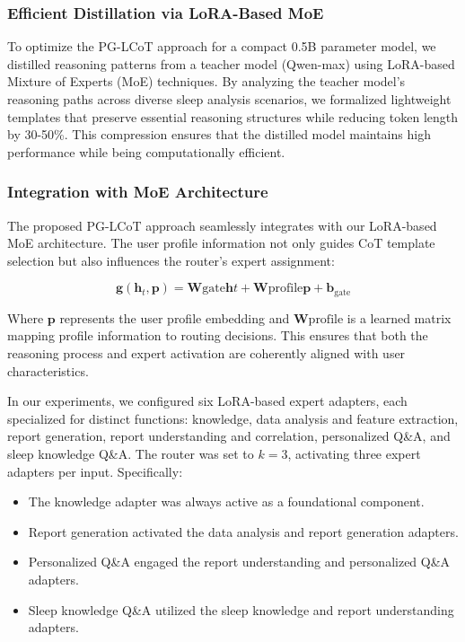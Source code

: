 \documentclass[preprint,12pt]{elsarticle}
\begin{document}
\subsubsection{Efficient Distillation via LoRA-Based MoE}

To optimize the PG-LCoT approach for a compact 0.5B parameter model, we distilled reasoning patterns from a teacher model (Qwen-max) using LoRA-based Mixture of Experts (MoE) techniques. By analyzing the teacher model's reasoning paths across diverse sleep analysis scenarios, we formalized lightweight templates that preserve essential reasoning structures while reducing token length by 30-50\%. This compression ensures that the distilled model maintains high performance while being computationally efficient.

\subsubsection{Integration with MoE Architecture}

The proposed PG-LCoT approach seamlessly integrates with our LoRA-based MoE architecture. The user profile information not only guides CoT template selection but also influences the router's expert assignment:

\begin{equation}
\mathbf{g}(\mathbf{h}_t, \mathbf{p}) = \mathbf{W}{\text{gate}}\mathbf{h}t + \mathbf{W}{\text{profile}}\mathbf{p} + \mathbf{b}_{\text{gate}}
\label{eq:gate_profile}
\end{equation}

Where $\mathbf{p}$ represents the user profile embedding and $\mathbf{W}{\text{profile}}$ is a learned matrix mapping profile information to routing decisions. This ensures that both the reasoning process and expert activation are coherently aligned with user characteristics.

In our experiments, we configured six LoRA-based expert adapters, each specialized for distinct functions: knowledge, data analysis and feature extraction, report generation, report understanding and correlation, personalized Q\&A, and sleep knowledge Q\&A. The router was set to $k=3$, activating three expert adapters per input. Specifically:
\begin{itemize}
\item The knowledge adapter was always active as a foundational component.
\item Report generation activated the data analysis and report generation adapters.
\item Personalized Q\&A engaged the report understanding and personalized Q\&A adapters.
\item Sleep knowledge Q\&A utilized the sleep knowledge and report understanding adapters.
\end{itemize}
\end{document}
